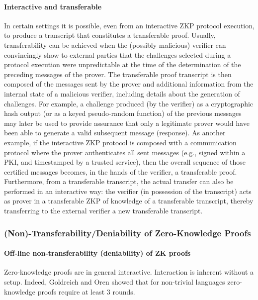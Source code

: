 \paragraph{Interactive and transferable} 
In certain settings it is possible, even from an interactive ZKP protocol execution, to produce a transcript that constitutes a transferable proof.
Usually, transferability can be achieved when the (possibly malicious) verifier can convincingly show to external parties that the challenges selected during a protocol execution were unpredictable at the time of the determination of the preceding messages of the prover.
The transferable proof transcript is then composed of the messages sent by the prover and additional information from the internal state of a malicious verifier, including details about the generation of challenges.
For example, a challenge produced (by the verifier) as a cryptographic hash output (or as a keyed pseudo-random function) of the previous messages may later be used to provide assurance that only a legitimate prover would have been able to generate a valid subsequent message (response).
As another example, if the interactive ZKP protocol is composed with a communication protocol where the prover authenticates all sent messages (e.g., signed within a PKI, and timestamped by a trusted service), then the overall sequence of those certified messages becomes, in the hands of the verifier, a transferable proof.
Furthermore, from a transferable transcript, the actual transfer can also be performed in an interactive way: the verifier (in possession of the transcript) acts as prover in a transferable ZKP of knowledge of a transferable transcript, thereby transferring to the external verifier a new transferable transcript.
\loosen



\subsubsection{(Non)-Transferability/Deniability of Zero-Knowledge Proofs}
\label{paradigms:interactivity:deniability:online-offline}


\paragraph{Off-line non-transferability (deniability) of ZK proofs}
Zero-knowledge proofs are in general interactive. 
Interaction is inherent without a setup. Indeed, Goldreich and Oren showed that for non-trivial languages zero-knowledge proofs require at least 3 rounds. 

